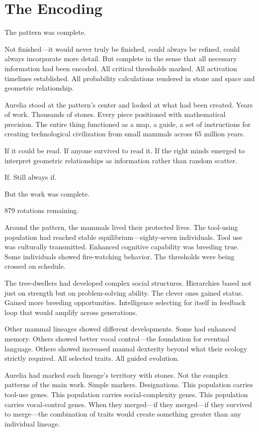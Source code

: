 \chapter{The Encoding}
\label{ch:09}


The pattern was complete.

Not finished—it would never truly be finished, could always be refined, could always incorporate more detail. But complete in the sense that all necessary information had been encoded. All critical thresholds marked. All activation timelines established. All probability calculations rendered in stone and space and geometric relationship.

Aurelia stood at the pattern's center and looked at what had been created. Years of work. Thousands of stones. Every piece positioned with mathematical precision. The entire thing functioned as a map, a guide, a set of instructions for creating technological civilization from small mammals across 65 million years.

If it could be read. If anyone survived to read it. If the right minds emerged to interpret geometric relationships as information rather than random scatter.

If. Still always if.

But the work was complete.

879 rotations remaining.

\scenebreak

Around the pattern, the mammals lived their protected lives. The tool-using population had reached stable equilibrium—eighty-seven individuals. Tool use was culturally transmitted. Enhanced cognitive capability was breeding true. Some individuals showed fire-watching behavior. The thresholds were being crossed on schedule.

The tree-dwellers had developed complex social structures. Hierarchies based not just on strength but on problem-solving ability. The clever ones gained status. Gained more breeding opportunities. Intelligence selecting for itself in feedback loop that would amplify across generations.

Other mammal lineages showed different developments. Some had enhanced memory. Others showed better vocal control—the foundation for eventual language. Others showed increased manual dexterity beyond what their ecology strictly required. All selected traits. All guided evolution.

Aurelia had marked each lineage's territory with stones. Not the complex patterns of the main work. Simple markers. Designations. This population carries tool-use genes. This population carries social-complexity genes. This population carries vocal-control genes. When they merged—if they merged—if they survived to merge—the combination of traits would create something greater than any individual lineage.


